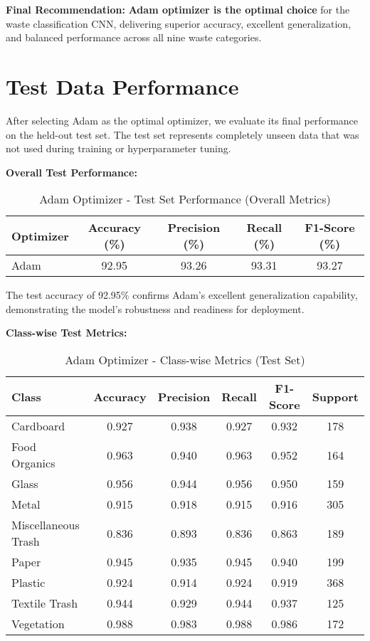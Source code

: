 \documentclass[12pt,a4paper]{article}
\begin{document}
\textbf{Final Recommendation:} \textbf{Adam optimizer is the optimal choice} for the waste classification CNN, delivering superior accuracy, excellent generalization, and balanced performance across all nine waste categories.

\section{Test Data Performance}

After selecting Adam as the optimal optimizer, we evaluate its final performance on the held-out test set. The test set represents completely unseen data that was not used during training or hyperparameter tuning.

\textbf{Overall Test Performance:}

\begin{table}[H]
\centering
\caption{Adam Optimizer - Test Set Performance (Overall Metrics)}
\begin{tabular}{lcccc}
\toprule
\textbf{Optimizer} & \textbf{Accuracy (\%)} & \textbf{Precision (\%)} & \textbf{Recall (\%)} & \textbf{F1-Score (\%)} \\
\midrule
Adam & 92.95 & 93.26 & 93.31 & 93.27 \\
\bottomrule
\end{tabular}
\end{table}

The test accuracy of 92.95\% confirms Adam's excellent generalization capability, demonstrating the model's robustness and readiness for deployment.

\textbf{Class-wise Test Metrics:}

\begin{table}[H]
\centering
\caption{Adam Optimizer - Class-wise Metrics (Test Set)}
\begin{tabular}{lccccc}
\toprule
\textbf{Class} & \textbf{Accuracy} & \textbf{Precision} & \textbf{Recall} & \textbf{F1-Score} & \textbf{Support} \\
\midrule
Cardboard & 0.927 & 0.938 & 0.927 & 0.932 & 178 \\
Food Organics & 0.963 & 0.940 & 0.963 & 0.952 & 164 \\
Glass & 0.956 & 0.944 & 0.956 & 0.950 & 159 \\
Metal & 0.915 & 0.918 & 0.915 & 0.916 & 305 \\
Miscellaneous Trash & 0.836 & 0.893 & 0.836 & 0.863 & 189 \\
Paper & 0.945 & 0.935 & 0.945 & 0.940 & 199 \\
Plastic & 0.924 & 0.914 & 0.924 & 0.919 & 368 \\
Textile Trash & 0.944 & 0.929 & 0.944 & 0.937 & 125 \\
Vegetation & 0.988 & 0.983 & 0.988 & 0.986 & 172 \\
\bottomrule
\end{tabular}
\end{table}
\end{document}
